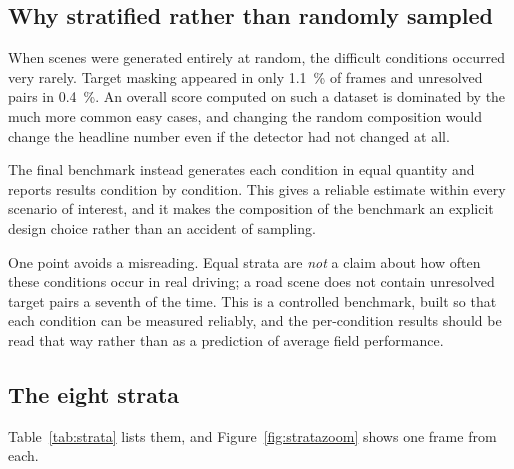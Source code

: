 \subsection{Why stratified rather than randomly sampled}

When scenes were generated entirely at random, the difficult conditions occurred very rarely.
Target masking appeared in only \SI{1.1}{\percent} of frames and unresolved pairs in
\SI{0.4}{\percent}. An overall score computed on such a dataset is dominated by the much more
common easy cases, and changing the random composition would change the headline number even if the
detector had not changed at all.

The final benchmark instead generates each condition in equal quantity and reports results
condition by condition. This gives a reliable estimate within every scenario of interest, and it
makes the composition of the benchmark an explicit design choice rather than an accident of
sampling.

One point avoids a misreading. Equal strata are \emph{not} a claim about
how often these conditions occur in real driving; a road scene does not contain unresolved target
pairs a seventh of the time. This is a controlled benchmark, built so that each condition can be
measured reliably, and the per-condition results should be read that way rather than as a
prediction of average field performance.

\subsection{The eight strata}

Table~\ref{tab:strata} lists them, and Figure~\ref{fig:stratazoom} shows one frame from each.

